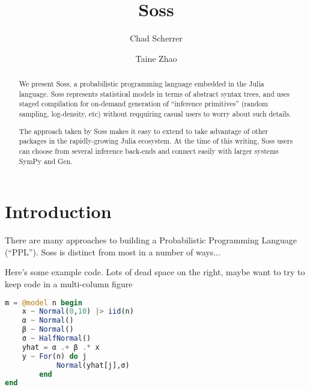 \documentclass[anonymous=false, %
               format=acmsmall, %
               review=true, %
               screen=true, %
               nonacm=true]{acmart}
\begin{document}
\title{Soss}

\author{Chad Scherrer}

\author{Taine Zhao}

\begin{abstract}
We present Soss, a probabilistic programming language embedded in the Julia language. Soss represents statistical models in terms of abstract syntax trees, and uses staged compilation for on-demand generation of ``inference primitives'' (random sampling, log-density, etc) without reqquiring casual users to worry about such details.

The approach taken by Soss makes it easy to extend to take advantage of other packages in the rapidly-growing Julia ecosystem. At the time of this writing, Soss users can choose from several inference back-ends and connect easily with larger systems SymPy and Gen.
\end{abstract}

\maketitle

\section{Introduction}

There are many approaches to building a Probabilistic Programming Language (``PPL''). Soss is distinct from most in a number of ways...

Here's some example code. Lots of dead space on the right, maybe want to try to keep code in a multi-column figure

\begin{lstlisting}[language = Julia]
m = @model n begin
    x ~ Normal(0,10) |> iid(n)
    α ~ Normal()
    β ~ Normal()
    σ ~ HalfNormal()
    yhat = α .+ β .* x
    y ~ For(n) do j 
            Normal(yhat[j],σ)
        end
end
\end{lstlisting} 
  
\end{document}
